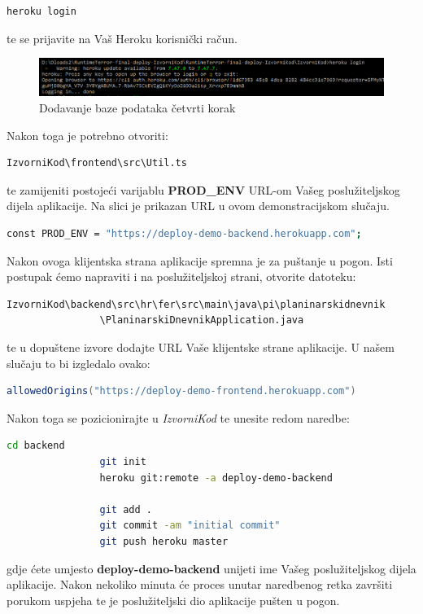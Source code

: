 			\begin{lstlisting}[language=bash]
				heroku login
			\end{lstlisting}
			 te se prijavite na Vaš Heroku korisnički račun.
			\begin{figure}[H]
				\includegraphics[width=160mm]{slike/h-login.png} %
				\centering
				\caption{Dodavanje baze podataka četvrti korak}
				\label{fig:dijagramdeployment}
			\end{figure}
			Nakon toga je potrebno otvoriti: 
			\begin{lstlisting}[language=bash]
				IzvorniKod\frontend\src\Util.ts
			\end{lstlisting}
			te zamijeniti postojeći varijablu \textbf{PROD\_ENV} URL-om Vašeg poslužiteljskog dijela aplikacije. Na slici je prikazan URL u ovom demonstracijskom slučaju.
			\begin{lstlisting}[language=bash]
				const PROD_ENV = "https://deploy-demo-backend.herokuapp.com";
			\end{lstlisting}
		
			Nakon ovoga klijentska strana aplikacije spremna je za puštanje u pogon.	
			Isti postupak ćemo napraviti i na poslužiteljskoj strani, otvorite datoteku:
			\begin{lstlisting}[language=bash]
				IzvorniKod\backend\src\hr\fer\src\main\java\pi\planinarskidnevnik
				\PlaninarskiDnevnikApplication.java
			\end{lstlisting}
			te u dopuštene izvore dodajte URL Vaše klijentske strane aplikacije. U našem slučaju to bi izgledalo ovako:
			
			\begin{lstlisting}[language=java]
				allowedOrigins("https://deploy-demo-frontend.herokuapp.com")
			\end{lstlisting}
			Nakon toga se pozicionirajte u \textit{IzvorniKod} te unesite redom naredbe:
			\begin{lstlisting}[language=bash]
				cd backend
				git init
				heroku git:remote -a deploy-demo-backend
				
				git add .
				git commit -am "initial commit"
				git push heroku master
			\end{lstlisting}
			
			gdje ćete umjesto \textbf{deploy-demo-backend} unijeti ime Vašeg poslužiteljskog dijela aplikacije. Nakon nekoliko minuta će proces unutar naredbenog retka završiti porukom uspjeha te je poslužiteljski dio aplikacije pušten u pogon.
			
